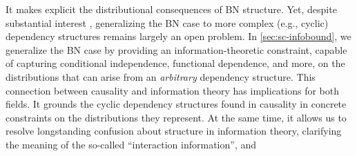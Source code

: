 It makes explicit the distributional consequences of BN structure.
Yet, despite
substantial interest \cite{Baier_2022},
generalizing the BN case to more
complex (e.g., cyclic) dependency structures remains largely an open
problem.  
In \cref{sec:sc-infobound}, we 
generalize the BN case by
providing an information-theoretic constraint,
capable of capturing conditional independence, functional dependence, and more,
on the distributions that can arise from an \emph{arbitrary} 
dependency structure.
This connection between causality and information theory has implications for both fields. It grounds the cyclic dependency structures found in causality in concrete constraints on the distributions they represent. 
At the same time, it allows us to resolve longstanding confusion about structure in information theory, clarifying the meaning of the so-called ``interaction information'', and
